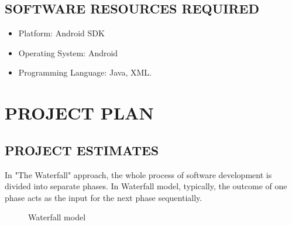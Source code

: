 \documentclass[12pt,a4paper]{report}
\begin{document}
\section{SOFTWARE RESOURCES REQUIRED}

\begin{itemize}
	\item Platform: Android SDK
\item  Operating System: Android
\item  Programming Language: Java, XML.
\end{itemize}

\chapter{PROJECT PLAN}
\newpage
\section{PROJECT ESTIMATES}
In "The Waterfall" approach, the whole process of software development is divided into separate phases. In Waterfall model, typically, the outcome of one phase acts as the input for the next phase sequentially.

\begin{figure}[!h]
	\begin{center}
		\caption{Waterfall model}
	\end{center}
\end{figure}
\end{document}
